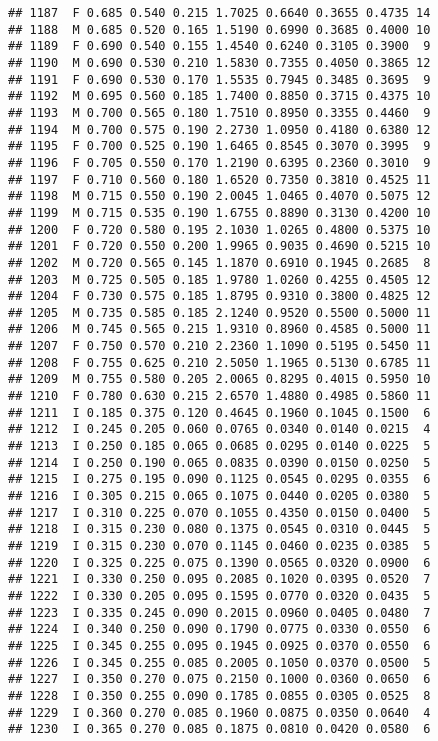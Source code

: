 \documentclass[
]{article}
\begin{document}
\begin{verbatim}
## 1187  F 0.685 0.540 0.215 1.7025 0.6640 0.3655 0.4735 14
## 1188  M 0.685 0.520 0.165 1.5190 0.6990 0.3685 0.4000 10
## 1189  F 0.690 0.540 0.155 1.4540 0.6240 0.3105 0.3900  9
## 1190  M 0.690 0.530 0.210 1.5830 0.7355 0.4050 0.3865 12
## 1191  F 0.690 0.530 0.170 1.5535 0.7945 0.3485 0.3695  9
## 1192  M 0.695 0.560 0.185 1.7400 0.8850 0.3715 0.4375 10
## 1193  M 0.700 0.565 0.180 1.7510 0.8950 0.3355 0.4460  9
## 1194  M 0.700 0.575 0.190 2.2730 1.0950 0.4180 0.6380 12
## 1195  F 0.700 0.525 0.190 1.6465 0.8545 0.3070 0.3995  9
## 1196  F 0.705 0.550 0.170 1.2190 0.6395 0.2360 0.3010  9
## 1197  F 0.710 0.560 0.180 1.6520 0.7350 0.3810 0.4525 11
## 1198  M 0.715 0.550 0.190 2.0045 1.0465 0.4070 0.5075 12
## 1199  M 0.715 0.535 0.190 1.6755 0.8890 0.3130 0.4200 10
## 1200  F 0.720 0.580 0.195 2.1030 1.0265 0.4800 0.5375 10
## 1201  F 0.720 0.550 0.200 1.9965 0.9035 0.4690 0.5215 10
## 1202  M 0.720 0.565 0.145 1.1870 0.6910 0.1945 0.2685  8
## 1203  M 0.725 0.505 0.185 1.9780 1.0260 0.4255 0.4505 12
## 1204  F 0.730 0.575 0.185 1.8795 0.9310 0.3800 0.4825 12
## 1205  M 0.735 0.585 0.185 2.1240 0.9520 0.5500 0.5000 11
## 1206  M 0.745 0.565 0.215 1.9310 0.8960 0.4585 0.5000 11
## 1207  F 0.750 0.570 0.210 2.2360 1.1090 0.5195 0.5450 11
## 1208  F 0.755 0.625 0.210 2.5050 1.1965 0.5130 0.6785 11
## 1209  M 0.755 0.580 0.205 2.0065 0.8295 0.4015 0.5950 10
## 1210  F 0.780 0.630 0.215 2.6570 1.4880 0.4985 0.5860 11
## 1211  I 0.185 0.375 0.120 0.4645 0.1960 0.1045 0.1500  6
## 1212  I 0.245 0.205 0.060 0.0765 0.0340 0.0140 0.0215  4
## 1213  I 0.250 0.185 0.065 0.0685 0.0295 0.0140 0.0225  5
## 1214  I 0.250 0.190 0.065 0.0835 0.0390 0.0150 0.0250  5
## 1215  I 0.275 0.195 0.090 0.1125 0.0545 0.0295 0.0355  6
## 1216  I 0.305 0.215 0.065 0.1075 0.0440 0.0205 0.0380  5
## 1217  I 0.310 0.225 0.070 0.1055 0.4350 0.0150 0.0400  5
## 1218  I 0.315 0.230 0.080 0.1375 0.0545 0.0310 0.0445  5
## 1219  I 0.315 0.230 0.070 0.1145 0.0460 0.0235 0.0385  5
## 1220  I 0.325 0.225 0.075 0.1390 0.0565 0.0320 0.0900  6
## 1221  I 0.330 0.250 0.095 0.2085 0.1020 0.0395 0.0520  7
## 1222  I 0.330 0.205 0.095 0.1595 0.0770 0.0320 0.0435  5
## 1223  I 0.335 0.245 0.090 0.2015 0.0960 0.0405 0.0480  7
## 1224  I 0.340 0.250 0.090 0.1790 0.0775 0.0330 0.0550  6
## 1225  I 0.345 0.255 0.095 0.1945 0.0925 0.0370 0.0550  6
## 1226  I 0.345 0.255 0.085 0.2005 0.1050 0.0370 0.0500  5
## 1227  I 0.350 0.270 0.075 0.2150 0.1000 0.0360 0.0650  6
## 1228  I 0.350 0.255 0.090 0.1785 0.0855 0.0305 0.0525  8
## 1229  I 0.360 0.270 0.085 0.1960 0.0875 0.0350 0.0640  4
## 1230  I 0.365 0.270 0.085 0.1875 0.0810 0.0420 0.0580  6

\end{verbatim}
\end{document}
